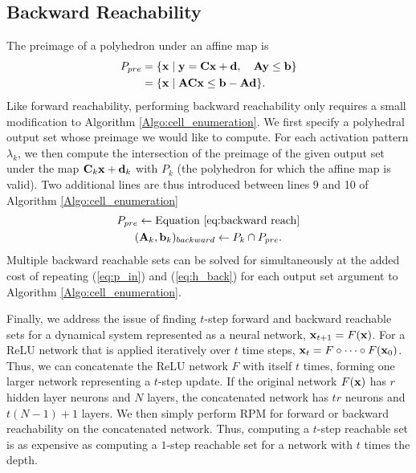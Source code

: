 \subsection{Backward Reachability} \label{Backward}
The preimage of a polyhedron under an affine map is
\begin{subequations}
    \begin{align}
        P_{pre} &= \{\mathbf{x} \mid \mathbf{y}=\mathbf{Cx}+\mathbf{d},\quad \mathbf{Ay} \le \mathbf{b}\} \\
        &= \{\mathbf{x} \mid \mathbf{ACx} \le \mathbf{b}-\mathbf{Ad}\}. \label{eq:backward reach}
    \end{align}
\end{subequations}
Like forward reachability, performing backward reachability only requires a small modification to Algorithm \ref{Algo:cell_enumeration}. We first specify a polyhedral output set whose preimage we would like to compute.  For each activation pattern $\lambda_k$, we then compute the intersection of the preimage of the given output set under the map $\mathbf{C}_k\mathbf{x} + \mathbf{d}_k$ with $P_k$ (the polyhedron for which the affine map is valid). Two additional lines are thus introduced between lines 9 and 10 of Algorithm \ref{Algo:cell_enumeration}
\begin{subequations}
    \begin{gather}
    P_{pre} \leftarrow \text{Equation}\ \ref{eq:backward reach} \label{eq:p_in} \\
    (\mathbf{A}_k, \mathbf{b}_k)_{backward} \leftarrow P_k \cap P_{pre}. \label{eq:h_back}
    \end{gather}
\end{subequations}
Multiple backward reachable sets can be solved for simultaneously at the added cost of repeating (\ref{eq:p_in}) and (\ref{eq:h_back}) for each output set argument to Algorithm \ref{Algo:cell_enumeration}.

Finally, we address the issue of finding $t$-step forward and backward reachable sets for a dynamical system represented as a neural network, $\mathbf{x}_{t+1} = F(\mathbf{x})$.
For a ReLU network that is applied iteratively over $t$ time steps, $\mathbf{x}_t = F \circ \cdots \circ F(\mathbf{x}_0)$.
Thus, we can concatenate the ReLU network $F$ with itself $t$ times, forming one larger network representing a $t$-step update.
If the original network $F(\mathbf{x})$ has $r$ hidden layer neurons and $N$ layers, the concatenated network has $tr$ neurons and $t(N-1) + 1$ layers.  
We then simply perform RPM for forward or backward reachability on the concatenated network.
Thus, computing a $t$-step reachable set is as expensive as computing a $1$-step reachable set for a network with $t$ times the depth.